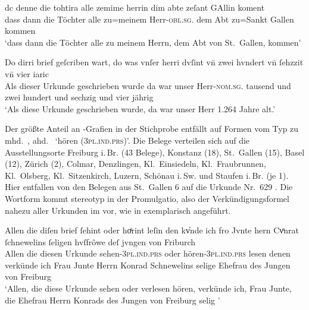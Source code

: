 \begin{exe}
\ex \label{ex:herrin}
	\begin{xlist}
	\ex\label{ex:stg_herrin}
		\setlength{\glossglue}{5pt plus 2pt minus 1pt}
		\gll dc denne die tohtira alle zemime herrin dim abte zeſant GAllin
				koment\\
			dass dann die Töchter alle zu=meinem Herr-\textsc{obl.sg.\MascM}
				dem Abt zu=Sankt Gallen kommen \\
		\trans `dass dann die Töchter alle zu meinem Herrn, dem Abt von
			St.~Gallen, kommen'
			\parencites(Nr.~628, St.~Gallen, 1284)[56,34]{cao2}

	\ex\label{ex:col_herri}
		\gll Do dirri brief geſcriben wart, do was vnſer herri dvſint vn̄ zwei
				hvndert vn̄ ſehzzit vn̄ vier iaric \\
			Als dieser Urkunde geschrieben wurde da war unser
				Herr-\textsc{nom.sg.\MascM} tausend und zwei hundert und
				sechzig und vier jährig \\
		\trans `Als diese Urkunde geschrieben wurde, da war unser Herr
			1.264 Jahre alt.'
			\parencites(Nr.~N~53, Colmar, 1264)[37,15]{cao5}
\end{xlist}
\end{exe}

Der größte Anteil an -Grafien in der Stichprobe entfällt auf Formen vom
Typ  zu mhd.~, ahd.~ `hören
(\textsc{3pl.ind.prs})'. Die Belege verteilen sich auf die Ausstellungsorte
Freiburg i.\,Br. (43 Belege), Konstanz (18), St.~Gallen (15), Basel (12),
Zürich (2), Colmar, Denzlingen, Kl.~Einsiedeln, Kl.~Fraubrunnen, Kl.~Olsberg,
Kl.~Sitzenkirch, Luzern, Schönau i.\,Sw. und Staufen i.\,Br. (je 1). Hier
entfallen von den Belegen aus St.~Gallen 6 auf die Urkunde Nr.~629
\autocites(St.~Gallen, 1284)[57,9--57,35]{cao2}. Die Wortform 
kommt stereotyp in der Promulgatio, also der Verkündigungsformel nahezu aller
Urkunden im  vor, wie in  exemplarisch
angeführt.

\begin{exe}
\ex\label{ex:fribr_hoerint}
	\gll Allen die diſen brief ſehint oder hoͤrint leſin den kv̓nde ich fro
			Jvnte hern Cvͦnrat ſchnewelins ſeligen hvſfrôwe deſ jvngen von
			Friburch \\
		Allen die diesen Urkunde sehen-\textsc{3pl.ind.prs} oder
			hören-\textsc{3pl.ind.prs} lesen denen verkünde ich Frau Junte Herrn
			Konrad Schnewelins selige Ehefrau des Jungen von Freiburg \\
	\trans `Allen, die diese Urkunde sehen oder verlesen hören, verkünde
		ich, Frau Junte, die Ehefrau Herrn Konrads des Jungen von Freiburg
		selig \textelp{}'
		\parencites(Nr.~328, Freiburg i.\,Br., 1277)[314,33--34]{cao1}
\end{exe}

